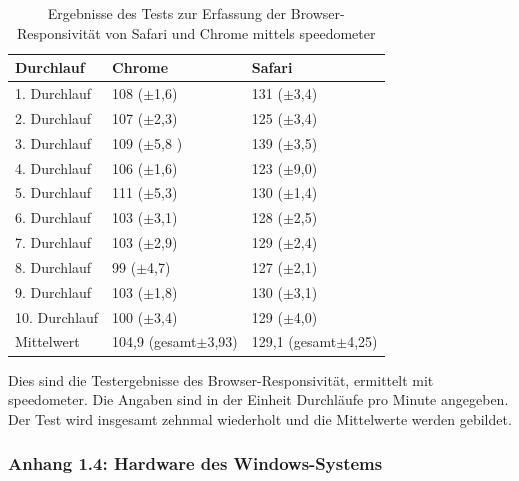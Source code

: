 \documentclass[a4paper]{scrartcl}
\begin{document}
\begin{table}[H]
	\centering
	\caption{Ergebnisse des Tests zur Erfassung der Browser-Responsivität von Safari und Chrome mittels speedometer}
	\begin{center}
		\begin{tabularx}{\linewidth}{| l || X | X |}
			\hline
			Durchlauf & Chrome & Safari \\ 
			\hline \hline
			1. Durchlauf & 108 (\( \pm \)1,6) & 131 (\( \pm \)3,4) \\
			\hline
			2. Durchlauf & 107 (\( \pm \)2,3) & 125 (\( \pm \)3,4) \\
			\hline
			3. Durchlauf & 109 (\( \pm \)5,8 ) & 139 (\( \pm \)3,5) \\
			\hline
			4. Durchlauf & 106 (\( \pm \)1,6) & 123 (\( \pm \)9,0) \\
			\hline
			5. Durchlauf & 111 (\( \pm \)5,3) & 130 (\( \pm \)1,4) \\
			\hline
			6. Durchlauf & 103 (\( \pm \)3,1) & 128 (\( \pm \)2,5) \\
			\hline
			7. Durchlauf & 103 (\( \pm \)2,9) & 129 (\( \pm \)2,4) \\
			\hline
			8. Durchlauf & 99 (\( \pm \)4,7) & 127 (\( \pm \)2,1) \\
			\hline
			9. Durchlauf & 103 (\( \pm \)1,8) & 130 (\( \pm \)3,1) \\
			\hline
			10. Durchlauf & 100 (\( \pm \)3,4) & 129 (\( \pm \)4,0) \\
			\hline \hline
			Mittelwert & 104,9 (gesamt\( \pm \)3,93) & 129,1 (gesamt\( \pm \)4,25) \\ 
			\hline
		\end{tabularx}
	\end{center}
	Dies sind die Testergebnisse des Browser-Responsivität, ermittelt mit speedometer. Die Angaben sind in der Einheit Durchläufe pro Minute angegeben. Der Test wird insgesamt zehnmal wiederholt und die Mittelwerte werden gebildet.
\end{table}

\newpage

\subsubsection*{Anhang 1.4: Hardware des Windows-Systems}
\end{document}
